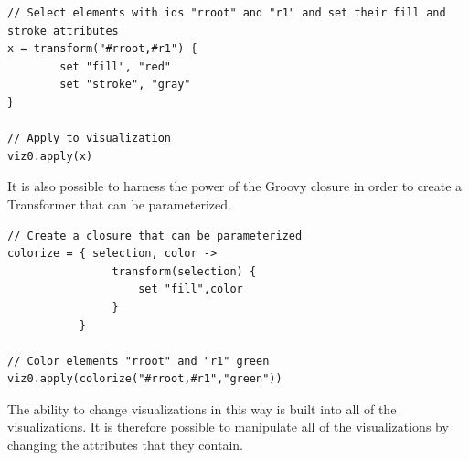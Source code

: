 \lstset{language=java}
\begin{lstlisting}[caption=Define rules for the transformation of visualization elements,label=tranformer]
// Select elements with ids "rroot" and "r1" and set their fill and stroke attributes
x = transform("#rroot,#r1") {
        set "fill", "red"
        set "stroke", "gray"
}

// Apply to visualization
viz0.apply(x)
\end{lstlisting}

It is also possible to harness the power of the Groovy closure in order to create a Transformer that can be parameterized.

\begin{lstlisting}[caption=Use Groovy closures to generate Transformers,label=transWclosure]
// Create a closure that can be parameterized
colorize = { selection, color ->
                transform(selection) {
                    set "fill",color
                }    
           }

// Color elements "rroot" and "r1" green
viz0.apply(colorize("#rroot,#r1","green"))
\end{lstlisting}

The ability to change visualizations in this way is built into all of the visualizations. It is therefore possible to manipulate all of the visualizations by changing the attributes that they contain.